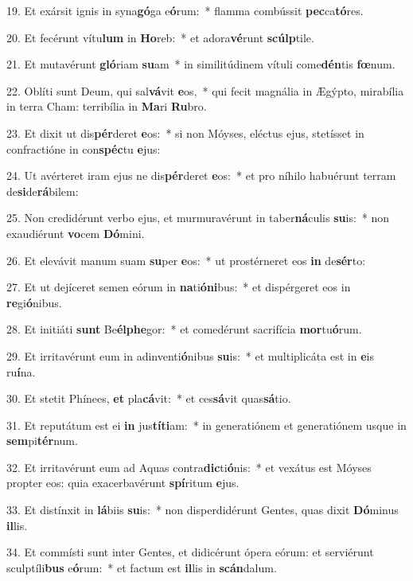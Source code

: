 19. Et exársit ignis in syna\textbf{gó}ga e\textbf{ó}rum:~*  flamma combússit \textbf{pec}ca\textbf{tó}res.\

20. Et fecérunt vítu\textbf{lum} in \textbf{Ho}reb:~*  et adora\textbf{vé}runt \textbf{scúlp}tile.\

21. Et mutavérunt \textbf{gló}riam \textbf{su}am~*  in similitúdinem vítuli come\textbf{dén}tis \textbf{fœ}num.\

22. Oblíti sunt Deum, qui sal\textbf{vá}vit \textbf{e}os,~*  qui fecit magnália in Ægýpto, mirabília in terra Cham: terribília in \textbf{Ma}ri \textbf{Ru}bro.\

23. Et dixit ut dis\textbf{pér}deret \textbf{e}os:~*  si non Móyses, eléctus ejus, stetísset in confractióne in con\textbf{spéc}tu \textbf{e}jus:\

24. Ut avérteret iram ejus ne dis\textbf{pér}deret \textbf{e}os:~*  et pro níhilo habuérunt terram de\textbf{si}de\textbf{rá}bilem:\

25. Non credidérunt verbo ejus, et murmuravérunt in taber\textbf{ná}culis \textbf{su}is:~*  non exaudiérunt \textbf{vo}cem \textbf{Dó}mini.\

26. Et elevávit manum suam \textbf{su}per \textbf{e}os:~*  ut prostérneret eos \textbf{in} de\textbf{sér}to:\

27. Et ut dejíceret semen eórum in \textbf{na}ti\textbf{ó}\textbf{ni}bus:~*  et dispérgeret eos in \textbf{re}gi\textbf{ó}nibus.\

28. Et initiáti \textbf{sunt} Be\textbf{él}\textbf{phe}gor:~*  et comedérunt sacrifícia \textbf{mor}tu\textbf{ó}rum.\

29. Et irritavérunt eum in adinventi\textbf{ó}nibus \textbf{su}is:~*  et multiplicáta est in \textbf{e}is ru\textbf{í}na.\

30. Et stetit Phínees, \textbf{et} pla\textbf{cá}vit:~*  et ces\textbf{sá}vit quas\textbf{sá}tio.\

31. Et reputátum est ei \textbf{in} jus\textbf{tí}\textbf{ti}am:~*  in generatiónem et generatiónem usque in \textbf{sem}pi\textbf{tér}num.\

32. Et irritavérunt eum ad Aquas contra\textbf{dic}ti\textbf{ó}nis:~*  et vexátus est Móyses propter eos: quia exacerbavérunt \textbf{spí}ritum \textbf{e}jus.\

33. Et distínxit in \textbf{lá}biis \textbf{su}is:~*  non disperdidérunt Gentes, quas dixit \textbf{Dó}minus \textbf{il}lis.\

34. Et commísti sunt inter Gentes, et didicérunt ópera eórum: et serviérunt sculptíli\textbf{bus} e\textbf{ó}rum:~*  et factum est \textbf{il}lis in \textbf{scán}dalum.\

